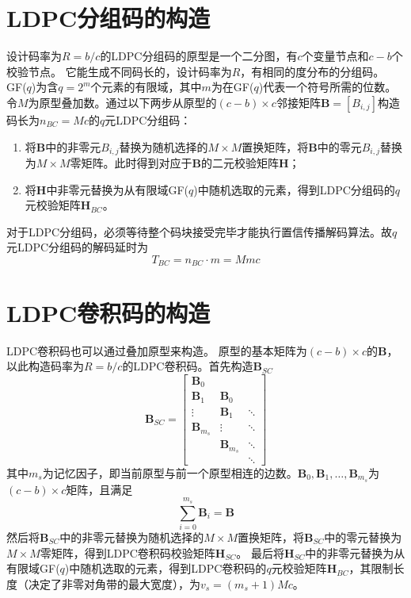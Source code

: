 \section{LDPC分组码的构造}
设计码率为$R=b/c$的LDPC分组码的原型是一个二分图，有$c$个变量节点和$c-b$个校验节点。
它能生成不同码长的，设计码率为$R$，有相同的度分布的分组码。
GF($q$)为含$q=2^m$个元素的有限域，其中$m$为在GF($q$)代表一个符号所需的位数。令$M$为原型叠加数。通过以下两步从原型的$(c-b)\times c$邻接矩阵$\mathbf{B}=[B_{i,j}]$构造码长为$n_{BC}=Mc$的$q$元LDPC分组码：
\begin{enumerate}
\item 将$\mathbf{B}$中的非零元$B_{i,j}$替换为随机选择的$M \times M$置换矩阵，将$\mathbf{B}$中的零元$B_{i,j}$替换为$M \times M$零矩阵。此时得到对应于$\mathbf{B}$的二元校验矩阵$\mathbf{H}$；
\item 将$\mathbf{H}$中非零元替换为从有限域GF($q$)中随机选取的元素，得到LDPC分组码的$q$元校验矩阵$\mathbf{H}_{BC}$。
\end{enumerate}
对于LDPC分组码，必须等待整个码块接受完毕才能执行置信传播解码算法。故$q$元LDPC分组码的解码延时为
\[
T_{BC}=n_{BC}\cdot m = Mmc
\]
\section{LDPC卷积码的构造}
LDPC卷积码也可以通过叠加原型来构造。
原型的基本矩阵为$(c-b)\times c$的$\mathbf{B}$，以此构造码率为$R=b/c$的LDPC卷积码。首先构造$\mathbf{B}_{SC}$
\begin{equation}
    \mathbf{B}_{SC} = \left[
          \begin{array}{ccc}
            \mathbf{B}_0& & \\
            \mathbf{B}_1 & \mathbf{B}_0 & \\
            \vdots & \mathbf{B}_1 & \ddots \\
            \mathbf{B}_{m_s} & \vdots & \ddots \\
             & \mathbf{B}_{m_s} & \ddots \\
             & & \ddots 
          \end{array} \right]
\end{equation}
其中$m_s$为记忆因子，即当前原型与前一个原型相连的边数。$\mathbf{B}_0 , \mathbf{B}_1 , \dots , \mathbf{B}_{m_s}$为$(c-b)\times c$矩阵，且满足
\[
\sum^{m_s}_{i=0} \mathbf{B}_i = \mathbf{B}
\]
然后将$\mathbf{B}_{SC}$中的非零元替换为随机选择的$M \times M$置换矩阵，将$\mathbf{B}_{SC}$中的零元替换为$M \times M$零矩阵，得到LDPC卷积码校验矩阵$\mathbf{H}_{SC}$。
最后将$\mathbf{H}_{SC}$中的非零元替换为从有限域GF($q$)中随机选取的元素，得到LDPC卷积码的$q$元校验矩阵$\mathbf{H}_{BC}$，其限制长度（决定了非零对角带的最大宽度），为$v_s=(m_s+1)Mc$。

